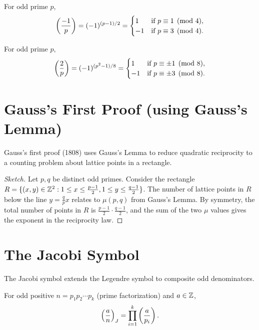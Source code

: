 \begin{supplement}
For odd prime $p$,
\[
\left(\frac{-1}{p}\right) = (-1)^{(p-1)/2} = 
\begin{cases}
1 & \text{if } p \equiv 1 \pmod{4}, \\
-1 & \text{if } p \equiv 3 \pmod{4}.
\end{cases}
\]
\end{supplement}

\begin{supplement}
For odd prime $p$,
\[
\left(\frac{2}{p}\right) = (-1)^{(p^2-1)/8} = 
\begin{cases}
1 & \text{if } p \equiv \pm 1 \pmod{8}, \\
-1 & \text{if } p \equiv \pm 3 \pmod{8}.
\end{cases}
\]
\end{supplement}

\section{Gauss's First Proof (using Gauss's Lemma)}

Gauss's first proof (1808) uses Gauss's Lemma to reduce quadratic reciprocity to a counting problem about lattice points in a rectangle.

\begin{proof}[Sketch]
Let $p, q$ be distinct odd primes. Consider the rectangle $R = \{(x,y) \in \mathbb{Z}^2 : 1 \le x \le \frac{p-1}{2}, 1 \le y \le \frac{q-1}{2}\}$. The number of lattice points in $R$ below the line $y = \frac{q}{p}x$ relates to $\mu(p,q)$ from Gauss's Lemma. By symmetry, the total number of points in $R$ is $\frac{p-1}{2} \cdot \frac{q-1}{2}$, and the sum of the two $\mu$ values gives the exponent in the reciprocity law.
\end{proof}

\section{The Jacobi Symbol}

The Jacobi symbol  extends the Legendre symbol to composite odd denominators.

\begin{definition}
For odd positive $n = p_1 p_2 \cdots p_k$ (prime factorization) and $a \in \mathbb{Z}$,
\[
\left(\frac{a}{n}\right)_J = \prod_{i=1}^k \left(\frac{a}{p_i}\right).
\]
\end{definition}

